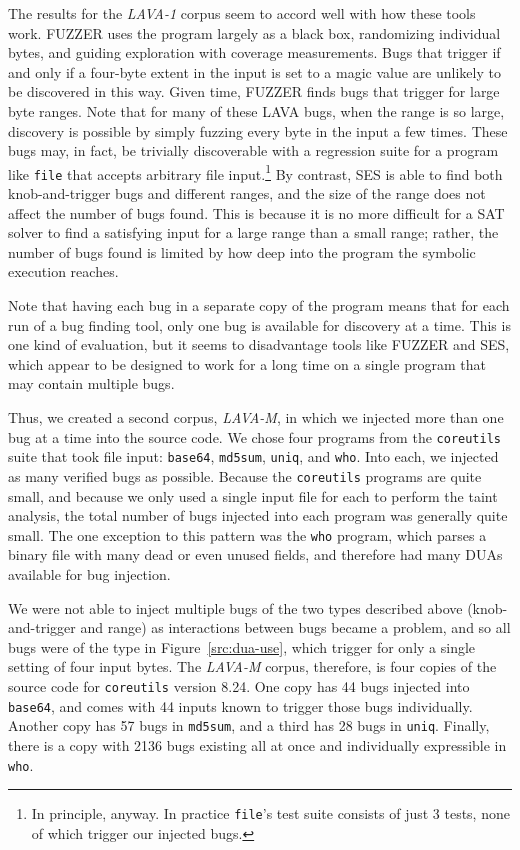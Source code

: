 The results for the \emph{LAVA-1} corpus seem to accord well with how these tools work.
FUZZER uses the program largely as a black box, randomizing individual bytes, and guiding exploration with coverage measurements.
Bugs that trigger if and only if a four-byte extent in the input is set to a magic value are unlikely to be discovered in this way.
Given time, FUZZER finds bugs that trigger for large byte ranges. 
Note that for many of these LAVA bugs, when the range is so large, discovery is possible by simply fuzzing every byte in the input a few times.  
These bugs may, in fact, be trivially discoverable with a regression suite for a program like \verb+file+ that accepts arbitrary file input.\footnote{In principle, anyway. In practice \texttt{file}'s test suite consists of just 3 tests, none of which trigger our injected bugs.}
By contrast, SES is able to find both knob-and-trigger bugs and different ranges, and the size of the range does not affect the number of bugs found.
This is because it is no more difficult for a SAT solver to find a satisfying input for a large range than a small range; rather, the number of bugs found is limited by how deep into the program the symbolic execution reaches.

Note that having each bug in a separate copy of the program means that for each run of a bug finding tool, only one bug is available for discovery at a time.  
This is one kind of evaluation, but it seems to disadvantage tools like FUZZER and SES, which appear to be designed to work for a long time on a single program that may contain multiple bugs. 

Thus, we created a second corpus, \emph{LAVA-M}, in which we injected more than one bug at a time into the source code.
We chose four programs from the \verb+coreutils+ suite that took file input: \verb+base64+, \verb+md5sum+, \verb+uniq+, and \verb+who+.
Into each, we injected as many verified bugs as possible.
Because the \verb+coreutils+ programs are quite small, and because we only used a single input file for each to perform the taint analysis, the total number of bugs injected into each program was generally quite small.
The one exception to this pattern was the \verb+who+ program, which parses a binary file with many dead or even unused fields, and therefore had many DUAs available for bug injection.

We were not able to inject multiple bugs of the two types described above (knob-and-trigger and range) as interactions between bugs became a problem, and so all bugs were of the type in Figure~\ref{src:dua-use}, which trigger for only a single setting of four input bytes.  
The \emph{LAVA-M} corpus, therefore, is four copies of the source code for \verb+coreutils+ version 8.24.
One copy has 44 bugs injected into \verb+base64+, and comes with 44 inputs known to trigger those bugs individually.
Another copy has 57 bugs in \verb+md5sum+, and a third has 28 bugs in \verb+uniq+.
Finally, there is a copy with 2136 bugs existing all at once and individually expressible in \verb+who+.


